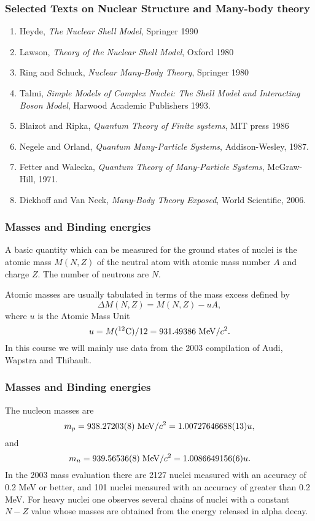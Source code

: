 \documentclass[compress]{beamer}
\begin{document}
\frame
{
  \frametitle{Selected Texts on Nuclear Structure and Many-body theory}
 \begin{small}
 {\scriptsize

  \begin{enumerate}
   \item Heyde, {\em The Nuclear Shell Model}, Springer 1990
   \item Lawson, {\em Theory of the Nuclear Shell Model}, Oxford 1980
   \item Ring and Schuck, {\em Nuclear Many-Body Theory}, Springer 1980
   \item Talmi, {\em Simple Models of Complex Nuclei: The Shell Model and Interacting Boson Model}, Harwood Academic Publishers 1993.
   \item Blaizot and Ripka, {\em Quantum Theory of Finite systems}, MIT press 1986
   \item Negele and Orland, {\em Quantum Many-Particle Systems}, Addison-Wesley, 1987.
   \item Fetter and Walecka, {\em Quantum Theory of Many-Particle Systems}, McGraw-Hill, 1971.
   \item Dickhoff and Van Neck, {\em Many-Body Theory Exposed}, World Scientific, 2006.
\end{enumerate}
 }
 \end{small}
}

\frame
{
  \frametitle{Masses and Binding energies}
\begin{small}
{\scriptsize
A basic quantity which can be measured for the ground states of nuclei is the atomic mass
$M(N, Z)$ of the neutral atom with atomic mass number $A$ and charge $Z$. The number of neutrons are $N$.

Atomic masses are
usually tabulated in terms of the mass excess defined by
\[
\Delta M(N, Z) =  M(N, Z) - uA,
\]
where $u$ is the Atomic Mass Unit 
\[
u = M(^{12}\mathrm{C})/12 = 931.49386 \hspace{0.1cm} \mathrm{MeV}/c^2.
\]
In this course we will mainly use 
data from the 2003 compilation of Audi, Wapstra and Thibault.
}
\end{small}
}







\frame
{
  \frametitle{Masses and Binding energies}
\begin{small}
{\scriptsize
The nucleon masses are
\[
m_p = 938.27203(8)\hspace{0.1cm} \mathrm{MeV}/c^2 = 1.00727646688(13)u,
\]
and 
\[
m_n = 939.56536(8)\hspace{0.1cm} \mathrm{MeV}/c^2 = 1.0086649156(6)u.
\]
In the 2003 mass evaluation there are 2127 nuclei measured with an accuracy of 0.2
MeV or better, and 101 nuclei measured with an accuracy of greater than 0.2 MeV. For
heavy nuclei one observes several chains of nuclei with a constant $N-Z$ value whose masses
are obtained from the energy released in alpha decay.
}
\end{small}
}
\end{document}
